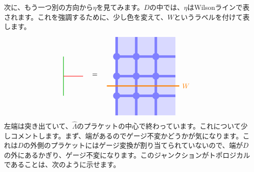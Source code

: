 \documentclass[report,paper=a4, fontsize=12pt, line_length=16cm, number_of_lines=33,dvipdfmx]{jlreq}
\numberwithin{equation}{chapter}
\newcommand{\Lambdah}{\widehat{\Lambda}}
\begin{document}
次に、もう一つ別の方向から$\eta$を見てみます。$D$の中では、$\eta$はWilsonラインで表されます。これを強調するために、少し色を変えて、$W$というラベルを付けて表します。
\begin{align}
  \begin{tikzpicture}[baseline=0]
      \draw[darkgreen,thick] (0,1)--(0,-1);
      \draw[red,thick] (1,0)--(0,0);
  \end{tikzpicture}
  \quad
  =\quad
  \begin{tikzpicture}[baseline=0cm]
      \foreach \x in {0,1,2}{
          \foreach \y in {-2,-1,...,1}{
          \fill[plaqblue](\x,\y) rectangle (\x+1,\y+1);
          }
      }
      \foreach \x in {0,1,2}{
          \foreach \y in {-1,0,1}{
              \fill[linkblue] (\x,\y) circle (1.8mm);
          }
      }
      \foreach \x in {0,1,2}{
          \foreach \y in {-1,0,1}{
              \draw[linkblue, line width = 1.3mm](\x,\y)--(\x + 1,\y);
          }
      }
      \foreach \x in {0,1,2}{
          \foreach \y in {-2,-1,...,1}{
              \draw[linkblue, line width = 1.3mm](\x,\y)--(\x,\y + 1);
          }
      }
      \draw[red!50!yellow,, ultra thick](-0.5,-0.5)--(3.2,-0.5) node[right]{$W$};
  \end{tikzpicture}        
\end{align}
左端は突き出ていて、$\Lambdah$のプラケットの中心で終わっています。これについて少しコメントします。まず、端があるのでゲージ不変かどうかが気になります。これは$D$の外側のプラケットにはゲージ変換が割り当てられていないので、端が$D$の外にあるかぎり、ゲージ不変になります。このジャンクションがトポロジカルであることは、次のように示せます。
\end{document}
